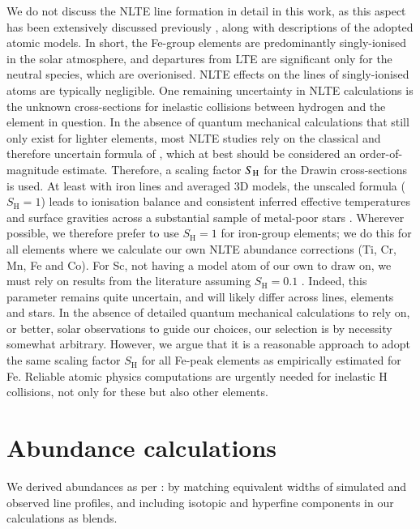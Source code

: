 \documentclass[traditabstract]{aa}
\begin{document}
We do not discuss the NLTE line formation in detail in this work, as this aspect has been extensively discussed previously \citep[e.g.][]{Bruls93,Bergemann07,Zhang08,Bergemann10Co,Bergemann10,Bergemann11,MB_fe}, along with descriptions of the adopted atomic models. In short, the Fe-group elements are predominantly singly-ionised in the solar atmosphere, and departures from LTE are significant only for the neutral species, which are overionised. NLTE effects on the lines of singly-ionised atoms are typically negligible. One remaining uncertainty in NLTE calculations is the unknown cross-sections for inelastic collisions between hydrogen and the element in question. In the absence of quantum mechanical calculations that still only exist for lighter elements, most NLTE studies rely on the classical and therefore uncertain formula of \citet{Drawin69}, which at best should be considered an order-of-magnitude estimate. Therefore, a scaling factor $S_{\rm H}$ for the Drawin cross-sections is used.  At least with iron lines and averaged 3D models, the unscaled \citeauthor{Drawin69} formula ($S_\mathrm{H}=1$) leads to ionisation balance and consistent inferred effective temperatures and surface gravities across a substantial sample of metal-poor stars \citep{MB_fe}.  Wherever possible, we therefore prefer to use $S_\mathrm{H}=1$ for iron-group elements; we do this for all elements where we calculate our own NLTE abundance corrections (Ti, Cr, Mn, Fe and Co).  For Sc, not having a model atom of our own to draw on, we must rely on results from the literature assuming $S_\mathrm{H}=0.1$ \citep{Zhang08}.  Indeed, this parameter remains quite uncertain, and will likely differ across lines, elements and stars. In the absence of detailed quantum mechanical calculations to rely on, or better, solar observations to guide our choices, our selection is by necessity somewhat arbitrary. However, we argue that it is a reasonable approach to adopt the same scaling factor $S_\mathrm{H}$ for all Fe-peak elements as empirically estimated for Fe. Reliable atomic physics computations are urgently needed for inelastic H collisions, not only for these but also other elements.

\section{Abundance calculations}
\label{calculations}

We derived abundances as per : by matching equivalent widths of simulated and observed line profiles, and including isotopic and hyperfine components in our calculations as blends.  
\end{document}
